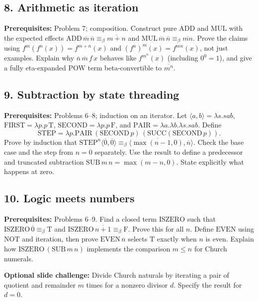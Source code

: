 \documentclass[12pt]{article}
\begin{document}
\subsection*{8. Arithmetic as iteration}
\textbf{Prerequisites:} Problem 7; composition.
Construct pure $\mathrm{ADD}$ and $\mathrm{MUL}$ with the expected effects $\mathrm{ADD}\,\overline m\,\overline n\equiv_\beta\overline{m+n}$ and $\mathrm{MUL}\,\overline m\,\overline n\equiv_\beta\overline{mn}$. Prove the claims using $f^m(f^n(x))=f^{m+n}(x)$ and $(f^n)^m(x)=f^{mn}(x)$, not just examples. Explain why $\overline n\,\overline m\,f\,x$ behaves like $f^{m^n}(x)$ (including $0^0=1$), and give a fully eta-expanded POW term beta-convertible to $\overline{m^n}$.

\subsection*{9. Subtraction by state threading}
\textbf{Prerequisites:} Problems 6--8; induction on an iterator.
Let $\langle a,b\rangle=\lambda s.sab$,
$\mathrm{FIRST}=\lambda p.p\,\mathrm{T}$,
$\mathrm{SECOND}=\lambda p.p\,\mathrm{F}$, and
$\mathrm{PAIR}=\lambda a.\lambda b.\lambda s.sab$.
Define
\[\mathrm{STEP}=\lambda p.\mathrm{PAIR}\,(\mathrm{SECOND}\,p)\,(\mathrm{SUCC}(\mathrm{SECOND}\,p)).\]
Prove by induction that $\mathrm{STEP}^n\langle\overline0,\overline0\rangle\equiv_\beta\langle\overline{\max(n-1,0)},\overline n\rangle$. Check the base case and the step from $n=0$ separately. Use the result to define a predecessor and truncated subtraction $\mathrm{SUB}\,m\,n=\max(m-n,0)$. State explicitly what happens at zero.

\subsection*{10. Logic meets numbers}
\textbf{Prerequisites:} Problems 6--9.
Find a closed term $\mathrm{ISZERO}$ such that $\mathrm{ISZERO}\,\overline0\equiv_\beta\mathrm{T}$ and $\mathrm{ISZERO}\,\overline{n+1}\equiv_\beta\mathrm{F}$. Prove this for all $n$. Define $\mathrm{EVEN}$ using $\mathrm{NOT}$ and iteration, then prove $\mathrm{EVEN}\,\overline n$ selects $\mathrm{T}$ exactly when $n$ is even. Explain how $\mathrm{ISZERO}\,(\mathrm{SUB}\,m\,n)$ implements the comparison $m\le n$ for Church numerals.

\textbf{Optional slide challenge:} Divide Church naturals by iterating a pair of quotient and remainder $m$ times for a nonzero divisor $d$. Specify the result for $d=0$.
\end{document}
